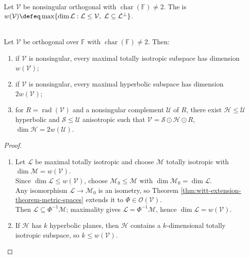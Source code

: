 \begin{definition} \label{def:orthogonal-witt-index} \\
Let $\mathcal{V}$ be nonsingular orthogonal with $\operatorname{char}(\mathbb{F})\neq2$.  The  is $w(\mathcal{V})\defeq\max\{\dim\mathcal{L}:\mathcal{L}\leq\mathcal{V},\ \mathcal{L}\subseteq\mathcal{L}^{\perp}\}$.
\end{definition}

\begin{theorem} \label{thm:orthogonal-witt-index-and-anisotropic-decomposition} \\
Let $\mathcal{V}$ be orthogonal over $\mathbb{F}$ with $\operatorname{char}(\mathbb{F})\neq2$. Then:
\begin{enumerate}[label=(\roman*)]
\setlength{\itemsep}{0pt}
\item if $\mathcal{V}$ is nonsingular, every maximal totally isotropic subspace has dimension $w(\mathcal{V})$;
\item if $\mathcal{V}$ is nonsingular, every maximal hyperbolic subspace has dimension $2w(\mathcal{V})$;
\item for $R=\operatorname{rad}(\mathcal{V})$ and a nonsingular complement $\mathcal{U}$ of $R$, there exist $\mathcal{H}\leq\mathcal{U}$ hyperbolic and $\mathcal{S}\leq\mathcal{U}$ anisotropic such that $\mathcal{V}=\mathcal{S}\odot\mathcal{H}\odot R$, $\dim\mathcal{H}=2w(\mathcal{U})$.
\end{enumerate}
\begin{proof}
\begin{enumerate}[label=(\roman*)]
\setlength{\itemsep}{0pt}
\item Let $\mathcal{L}$ be maximal totally isotropic and choose $\mathcal{M}$ totally isotropic with $\dim\mathcal{M}=w(\mathcal{V})$.\\
Since $\dim\mathcal{L}\leq w(\mathcal{V})$, choose $\mathcal{M}_0\leq\mathcal{M}$ with $\dim\mathcal{M}_0=\dim\mathcal{L}$.\\
Any isomorphism $\mathcal{L}\to\mathcal{M}_0$ is an isometry, so Theorem \ref{thm:witt-extension-theorem-metric-spaces} extends it to $\Phi\in\mathcal{O}(\mathcal{V})$.\\
Then $\mathcal{L}\subseteq\Phi^{-1}\mathcal{M}$; maximality gives $\mathcal{L}=\Phi^{-1}\mathcal{M}$, hence $\dim\mathcal{L}=w(\mathcal{V})$.
\item If $\mathcal{H}$ has $k$ hyperbolic planes, then $\mathcal{H}$ contains a $k$-dimensional totally isotropic subspace, so $k\leq w(\mathcal{V})$.\\

\end{enumerate}
\end{proof}
\end{theorem}
